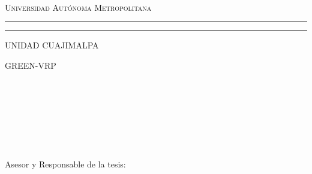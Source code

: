 \documentclass[12pt,titlepage,twoside,openright]{book}
\newcommand{\uamlogo}[3][2pt]{
    \psset{unit=#2,linewidth=#1 }
    \psline*[linearc=.25,linecolor=#3](2.8,2)(2,2)(1.8,0)(2.8,2)(3.8,0)(3.6,2)(2,2)(1.8,0)
    \psline*[linecolor=#3](0,0)(.8,0)(1.8,2)(1,2)(0,0)
    \psline*[linecolor=#3](4.8,0)(3.8,2)(4.6,2)(5.6,0)(4.8,0)
    \psline*[linearc=.25,linecolor=#3](3.8,0)(2.8,2)(3.6,2)(4.6,0)(3.8,0)
    \psline*[linearc=.25,linecolor=#3](4.6,0)(3.8,0)(2.8,2)(3.6,2)(4.6,0)
    \rput{180}(5.6,2){%
    \psline*[linearc=.25,linecolor=white](2.8,2)(2,2)(1.8,0)(2.8,2)(3.8,0)(3.6,2)(2,2)(1.8,0)
    \psline*[linearc=.25,linecolor=white](1,0)(1.8,0)(2.8,2)(2,2)(1,0)
    \psline*[linearc=.25,linecolor=white](1.8,0)(1,0)(2,2)(2.8,2)(1.8,0)
    \psline*[linearc=.25,linecolor=white](3.8,0)(2.8,2)(3.6,2)(4.6,0)(3.8,0)
    \psline*[linearc=.25,linecolor=white](4.6,0)(3.8,0)(2.8,2)(3.6,2)(4.6,0)
    \psline[linearc=.25,linecolor=#3](1,0)(2,2)(3.6,2)(4.6,0)
    \psline[linecolor=#3](1,0)(1.8,0)
    \psline[linearc=.25,linecolor=#3](4.6,0)(3.8,0)
    \psline[linearc=.25,linecolor=#3](1.8,0)(2.8,2)(3.8,0)}
    \psline*[linearc=.25,linecolor=#3](1,0)(1.8,0)(2.8,2)(2,2)(1,0)
    \psline*[linearc=.25,linecolor=#3](1.8,0)(1,0)(2,2)(2.8,2)(1.8,0)}
\begin{document}


\thispagestyle{empty}

\hskip-1.5cm
\begin{minipage}[c][5cm][s]{4cm}
  \begin{center}

  
    \hskip2pt \vrule width2pt height16cm\hskip1mm
    \vrule width1pt height16cm\\[10pt]

  \end{center}
\end{minipage}\quad
\begin{minipage}[c][9.5cm][s]{10cm}
  \begin{center}
    {\Large \scshape Universidad Aut\'onoma Metropolitana}
    \vspace{.3cm}
    \hrule height2pt
    \vspace{.1cm}
    \hrule height1pt
    \vspace{.3cm}
    { UNIDAD CUAJIMALPA}


    \vspace{2cm}
    
    {\Large \textsc{GREEN-VRP}} 

    \vspace{2cm}
    \\[8pt]
    
   
    \\[3pt]
    \elnombre\\
    \vspace{.5cm}
  {\textsc {\large \lacarrera}}\\[3pt]
  \\[13pt]
\\[13pt]


    \vspace{2cm}

    { Asesor y Responsable de la tesis:\\ \eldirector\\}

    \vspace{2cm}
\begin{flushright}
\lafecha 
\end{flushright}

  \end{center}
\end{minipage}
\end{document}
